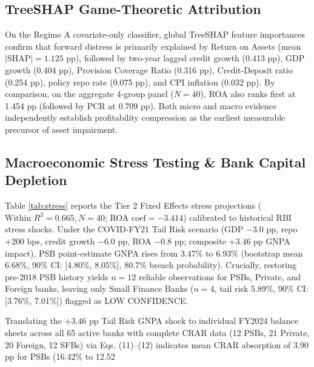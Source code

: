 \documentclass[conference]{IEEEtran}
\begin{document}
\subsection{TreeSHAP Game-Theoretic Attribution}
On the Regime A covariate-only classifier, global TreeSHAP feature importances \cite{lundberg2017, lundberg2020} confirm that forward distress is primarily explained by Return on Assets (mean $|\text{SHAP}| = 1.125$ pp), followed by two-year lagged credit growth (0.413 pp), GDP growth (0.404 pp), Provision Coverage Ratio (0.316 pp), Credit-Deposit ratio (0.254 pp), policy repo rate (0.075 pp), and CPI inflation (0.032 pp). By comparison, on the aggregate 4-group panel ($N = 40$), ROA also ranks first at 1.454 pp (followed by PCR at 0.709 pp). Both micro and macro evidence independently establish profitability compression as the earliest measurable precursor of asset impairment.

\subsection{Macroeconomic Stress Testing \& Bank Capital Depletion}
Table \ref{tab:stress} reports the Tier 2 Fixed Effects stress projections ($\text{Within } R^2 = 0.665, N = 40$; ROA $\text{coef} = -3.414$) calibrated to historical RBI stress shocks. Under the COVID-FY21 Tail Risk scenario (GDP $-3.0$ pp, repo $+200$ bps, credit growth $-6.0$ pp, ROA $-0.8$ pp; composite $+3.46$ pp GNPA impact), PSB point-estimate GNPA rises from 3.47\% to 6.93\% (bootstrap mean 6.68\%, 90\% CI: [4.80\%, 8.05\%], 80.7\% breach probability). Crucially, restoring pre-2018 PSB history yields $n = 12$ reliable observations for PSBs, Private, and Foreign banks, leaving only Small Finance Banks ($n = 4$, tail risk 5.89\%, 90\% CI: [3.76\%, 7.01\%]) flagged as LOW CONFIDENCE.

Translating the $+3.46$ pp Tail Risk GNPA shock to individual FY2024 balance sheets across all 65 active banks with complete CRAR data (12 PSBs, 21 Private, 20 Foreign, 12 SFBs) via Eqs. (11)--(12) indicates mean CRAR absorption of 3.90 pp for PSBs (16.42\% to 12.52%
\end{document}
